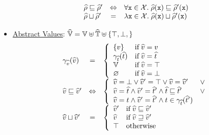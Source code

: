 \begin{itemize}
\[\begin{array}{lcl}
        \widehat{\rho} \sqsubseteq \widehat{\rho}' &\Leftrightarrow&
        \forall \texttt{x} \in \mathcal{X}. \;
        \widehat{\rho}(\texttt{x}) \sqsubseteq \widehat{\rho}'(\texttt{x})\\

        \widehat{\rho} \sqcup \widehat{\rho}' &=&
        \lambda \texttt{x} \in \mathcal{X}. \;
        \widehat{\rho}(\texttt{x}) \sqcup \widehat{\rho}'(\texttt{x})\\
      \end{array}
    \]

  \item \underline{Abstract Values}: $\widehat{\mathbb{V}} = \mathbb{V} \uplus \widehat{\mathbb{T}} \uplus
    \{ \top, \bot,  \}$
    \[
      \begin{array}{lcl}
        \gamma_{\widehat{v}}(\widehat{v}) &=& \left\{
          \begin{array}{ll}
            \{ v \} & \text{if} \; \widehat{v} = v\\
            \gamma_{\widehat{t}}(\widehat{t}) & \text{if} \; \widehat{v} = \widehat{t}\\
            \mathbb{V} & \text{if} \; \widehat{v} = \top\\
            \varnothing & \text{if} \; \widehat{v} = \bot\\
          \end{array}
        \right.\\

        \widehat{v} \sqsubseteq \widehat{v}' &\Leftrightarrow& \left\{
          \begin{array}{ll}
            \widehat{v} = \bot \vee \widehat{v}' = \top \vee \widehat{v} = \widehat{v}' & \vee\\
            \widehat{v} = \widehat{t} \wedge \widehat{v}' = \widehat{t}' \wedge
            \widehat{t} \sqsubseteq \widehat{t}' &\vee\\
            \widehat{v} = t \wedge \widehat{v}' = \widehat{t}' \wedge t \in
            \gamma_{\widehat{t}}(\widehat{t}')\\
          \end{array}
        \right.\\

        \widehat{v} \sqcup \widehat{v}' &=& \left\{
          \begin{array}{ll}
            \widehat{v}' & \text{if} \; \widehat{v} \sqsubseteq \widehat{v}'\\
            \widehat{v} & \text{if} \; \widehat{v} \sqsupseteq \widehat{v}'\\
            \top & \text{otherwise}\\
          \end{array}
        \right.\\
      \end{array}
    \]
\end{itemize}

